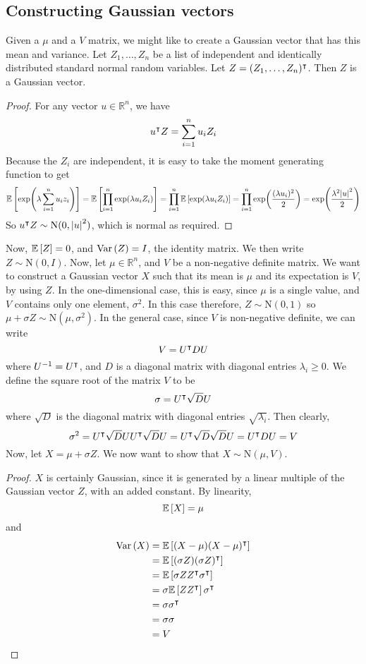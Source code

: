 \subsection{Constructing Gaussian vectors}
Given a \(\mu\) and a \(V\) matrix, we might like to create a Gaussian vector that has this mean and variance.
Let \(Z_1, \dots, Z_n\) be a list of independent and identically distributed standard normal random variables.
Let \(Z = (Z_1, \dots, Z_n)^\intercal\).
Then \(Z\) is a Gaussian vector.
\begin{proof}
	For any vector \(u \in \mathbb R^n\), we have
	\[
		u^\intercal Z = \sum_{i=1}^n u_i Z_i
	\]
	Because the \(Z_i\) are independent, it is easy to take the moment generating function to get
	\[
		\mathbb{E}\left[{\exp(\lambda \sum_{i=1}^n u_i z_i)}\right] = \mathbb{E}\left[{\prod_{i=1}^n \exp(\lambda u_i Z_i)}\right] = \prod_{i=1}^n \mathbb{E}\left[{\exp(\lambda u_i Z_i)}\right] = \prod_{i=1}^n \exp(\frac{(\lambda u_i)^2}{2}) = \exp(\frac{\lambda^2 \abs{u}^2}{2})
	\]
	So \(u^\intercal Z \sim \mathrm{N}(0, \abs{u}^2)\), which is normal as required.
\end{proof}
\noindent Now, \(\mathbb{E}\left[{Z}\right] = 0\), and \(\operatorname{Var}\left({Z}\right) = I\), the identity matrix.
We then write \(Z \sim \mathrm{N}(0, I)\).
Now, let \(\mu \in \mathbb R^n\), and \(V\) be a non-negative definite matrix.
We want to construct a Gaussian vector \(X\) such that its mean is \(\mu\) and its expectation is \(V\), by using \(Z\).
In the one-dimensional case, this is easy, since \(\mu\) is a single value, and \(V\) contains only one element, \(\sigma^2\).
In this case therefore, \(Z \sim \mathrm{N}(0, 1)\) so \(\mu + \sigma Z \sim \mathrm{N}(\mu, \sigma^2)\).
In the general case, since \(V\) is non-negative definite, we can write
\[
	V = U^\intercal DU
\]
where \(U^{-1} = U^\intercal\), and \(D\) is a diagonal matrix with diagonal entries \(\lambda_i \geq 0\).
We define the square root of the matrix \(V\) to be
\[
	\sigma = U^\intercal \sqrt{D} U
\]
where \(\sqrt{D}\) is the diagonal matrix with diagonal entries \(\sqrt{\lambda_i}\).
Then clearly,
\[
	\sigma^2 = U^\intercal \sqrt{D} U U^\intercal \sqrt{D} U = U^\intercal \sqrt{D} \sqrt{D} U = U^\intercal DU = V
\]
Now, let \(X = \mu + \sigma Z\).
We now want to show that \(X \sim \mathrm{N}(\mu, V)\).
\begin{proof}
	\(X\) is certainly Gaussian, since it is generated by a linear multiple of the Gaussian vector \(Z\), with an added constant.
	By linearity,
	\[
		\mathbb{E}\left[{X}\right] = \mu
	\]
	and
	\begin{align*}
		\operatorname{Var}\left({X}\right) & = \mathbb{E}\left[{(X - \mu)(X - \mu)^\intercal}\right]           \\
		        & = \mathbb{E}\left[{(\sigma Z)(\sigma Z)^\intercal}\right]         \\
		        & = \mathbb{E}\left[{\sigma Z Z^\intercal \sigma^\intercal}\right] \\
		        & = \sigma \mathbb{E}\left[{Z Z^\intercal}\right] \sigma^\intercal \\
		        & = \sigma \sigma^\intercal                         \\
		        & = \sigma \sigma                                    \\
		        & = V
	\end{align*}
\end{proof}

